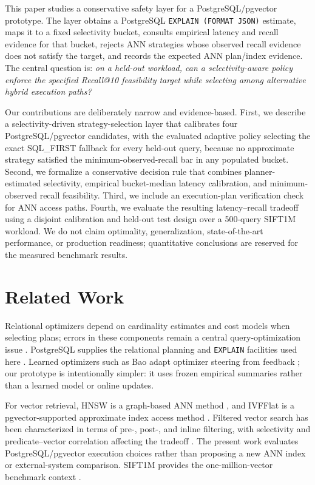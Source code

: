 \documentclass[conference]{IEEEtran}
\begin{document}
This paper studies a conservative safety layer for a PostgreSQL/pgvector prototype. The layer obtains a PostgreSQL \texttt{EXPLAIN (FORMAT JSON)} estimate, maps it to a fixed selectivity bucket, consults empirical latency and recall evidence for that bucket, rejects ANN strategies whose observed recall evidence does not satisfy the target, and records the expected ANN plan/index evidence. The central question is: \emph{on a held-out workload, can a selectivity-aware policy enforce the specified Recall@10 feasibility target while selecting among alternative hybrid execution paths?}

Our contributions are deliberately narrow and evidence-based. First, we describe a selectivity-driven strategy-selection layer that calibrates four PostgreSQL/pgvector candidates, with the evaluated adaptive policy selecting the exact SQL\_FIRST fallback for every held-out query, because no approximate strategy satisfied the minimum-observed-recall bar in any populated bucket. Second, we formalize a conservative decision rule that combines planner-estimated selectivity, empirical bucket-median latency calibration, and minimum-observed recall feasibility. Third, we include an execution-plan verification check for ANN access paths. Fourth, we evaluate the resulting latency--recall tradeoff using a disjoint calibration and held-out test design over a 500-query SIFT1M workload. We do not claim optimality, generalization, state-of-the-art performance, or production readiness; quantitative conclusions are reserved for the measured benchmark results.

\section{Related Work}
Relational optimizers depend on cardinality estimates and cost models when selecting plans; errors in these components remain a central query-optimization issue \cite{optimizer_survey}. PostgreSQL supplies the relational planning and \texttt{EXPLAIN} facilities used here \cite{postgresql16}. Learned optimizers such as Bao adapt optimizer steering from feedback \cite{bao}; our prototype is intentionally simpler: it uses frozen empirical summaries rather than a learned model or online updates.

For vector retrieval, HNSW is a graph-based ANN method \cite{malkov2020hnsw}, and IVFFlat is a pgvector-supported approximate index access method \cite{pgvector}. Filtered vector search has been characterized in terms of pre-, post-, and inline filtering, with selectivity and predicate--vector correlation affecting the tradeoff \cite{filtered_vector_search}. The present work evaluates PostgreSQL/pgvector execution choices rather than proposing a new ANN index or external-system comparison. SIFT1M provides the one-million-vector benchmark context \cite{faiss_sift1m}.
\end{document}
